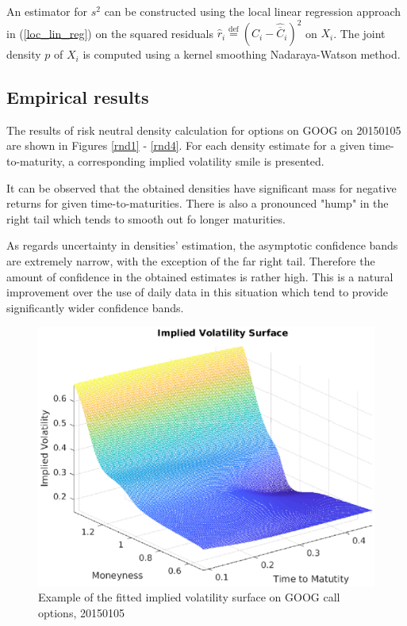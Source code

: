 \documentclass[a4paper,12pt]{article}
\theoremstyle{plain}
\theoremstyle{definition}
\begin{document}
An estimator for $s^2$ can be constructed using the local linear regression approach in (\ref{loc_lin_reg}) on the squared residuals $\widehat{r}_i \stackrel{\operatorname{def}}{=} (C_i - \widehat{\overline{C}}_{i})^2$ on $X_i$. The joint density $p$ of $X_i$ is computed using a kernel smoothing Nadaraya-Watson method. 


\subsection{Empirical results}
The results of risk neutral density calculation for options on GOOG on 20150105 are shown in Figures \ref{rnd1} - \ref{rnd4}. For each density estimate for a given time-to-maturity, a corresponding implied volatility smile is presented.

It can be observed that the obtained densities have significant mass for negative returns for given time-to-maturities. There is also a pronounced "hump" in the right tail which tends to smooth out fo longer maturities.

As regards uncertainty in densities' estimation, the asymptotic confidence bands are extremely narrow, with the exception of the far right tail. Therefore the amount of confidence in the obtained estimates is rather high. This is a natural improvement over the use of daily data in this situation which tend to provide significantly wider confidence bands.

\newpage

\vspace*{\fill}
\begin{figure}[H]
\begin{center}
\includegraphics[scale=0.7]{figures/ivs_example.eps}
\end{center}
\vspace{-3mm}
\caption{\footnotesize Example of the fitted implied volatility surface on GOOG call options, 20150105 }
\label{ivsurf}
\end{figure}
\vspace*{\fill}
\end{document}
